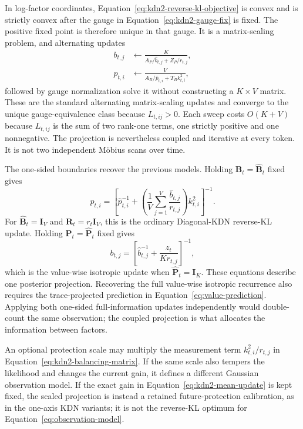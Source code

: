 \documentclass[11pt]{article}
\newcommand{\ve}[1]{\boldsymbol{#1}}
\begin{document}
In log-factor coordinates, Equation~\eqref{eq:kdn2-reverse-kl-objective} is convex and is strictly
convex after the gauge in Equation~\eqref{eq:kdn2-gauge-fix} is fixed.  The positive fixed point is
therefore unique in that gauge.  It is a matrix-scaling problem, and alternating updates
\begin{equation}
\begin{aligned}
  b_{t,j}&\leftarrow
  \frac{K}{A_P/\widehat b_{t,j}+Z_P/r_{t,j}},
  \\
  p_{t,i}&\leftarrow
  \frac{V}{A_B/\widehat p_{t,i}+T_Bk_{t,i}^2},
\end{aligned}
  \label{eq:kdn2-alternating-projection}
\end{equation}
followed by gauge normalization solve it without constructing a $K\times V$ matrix.  These are
the standard alternating matrix-scaling updates and converge to the unique gauge-equivalence
class because $L_{t,ij}>0$.  Each sweep costs $O(K+V)$ because $L_{t,ij}$ is the sum of two
rank-one terms, one strictly positive and one nonnegative.  The projection is nevertheless
coupled and iterative at every token.  It is not two independent M\"obius scans over time.

The one-sided boundaries recover the previous models.  Holding
$\ve{B}_t=\widehat{\ve{B}}_t$ fixed gives
\begin{equation}
  p_{t,i}
  =\left[
    \widehat p_{t,i}^{-1}
    +\left(\frac{1}{V}\sum_{j=1}^{V}\frac{\widehat b_{t,j}}{r_{t,j}}\right)k_{t,i}^2
  \right]^{-1}.
  \label{eq:kdn2-fixed-b-boundary}
\end{equation}
For $\widehat{\ve{B}}_t=\ve{I}_V$ and $\ve{R}_t=r_t\ve{I}_V$, this is the ordinary
Diagonal-KDN reverse-KL update.  Holding
$\ve{P}_t=\widehat{\ve{P}}_t$ fixed gives
\begin{equation}
  b_{t,j}
  =\left[
    \widehat b_{t,j}^{-1}
    +\frac{z_t}{K r_{t,j}}
  \right]^{-1},
  \label{eq:kdn2-fixed-p-boundary}
\end{equation}
which is the value-wise isotropic update when
$\widehat{\ve{P}}_t=\ve{I}_K$.  These equations describe one posterior projection.  Recovering
the full value-wise isotropic recurrence also requires the trace-projected prediction in
Equation~\eqref{eq:value-prediction}.  Applying both one-sided full-information updates
independently would double-count the same observation; the coupled projection is what allocates
the information between factors.

An optional protection scale may multiply the measurement term $k_{t,i}^2/r_{t,j}$ in
Equation~\eqref{eq:kdn2-balancing-matrix}.  If the same scale also tempers the likelihood and
changes the current gain, it defines a different Gaussian observation model.  If the exact gain
in Equation~\eqref{eq:kdn2-mean-update} is kept fixed, the scaled projection is instead a retained
future-protection calibration, as in the one-axis KDN variants; it is not the reverse-KL optimum
for Equation~\eqref{eq:observation-model}.
\end{document}
